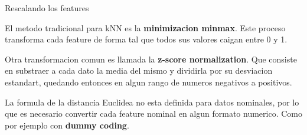 \documentclass[ignorenonframetext,]{beamer}
\begin{document}
\begin{frame}

\begin{block}{Rescalando los features}

El metodo tradicional para kNN es la \textbf{minimizacion minmax}. Este
proceso transforma cada feature de forma tal que todos sus valores
caigan entre 0 y 1.

Otra transformacion comun es llamada la \textbf{z-score normalization}.
Que consiste en substraer a cada dato la media del mismo y dividirla por
su desviacion estandart, quedando entonces en algun rango de numeros
negativos a positivos.

La formula de la distancia Euclidea no esta definida para datos
nominales, por lo que es necesario convertir cada feature nominal en
algun formato numerico. Como por ejemplo con \textbf{dummy coding}.

\end{block}

\end{frame}
\end{document}
